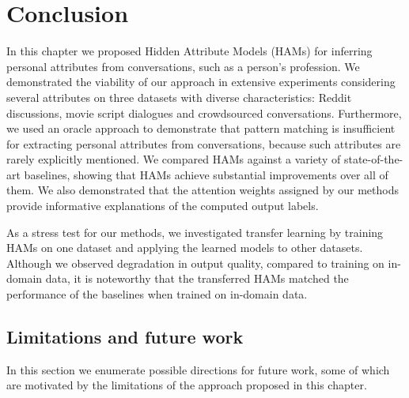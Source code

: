 \section{Conclusion}
In this chapter we proposed Hidden Attribute Models (HAMs) for inferring personal attributes from conversations, such as a person's profession. 
We demonstrated the viability of our approach in extensive experiments considering several attributes on three datasets with diverse characteristics: Reddit discussions, movie script dialogues and crowdsourced conversations. 
Furthermore, we used an oracle approach to demonstrate that pattern matching is insufficient for extracting personal attributes from conversations, because such attributes are rarely explicitly mentioned.
We compared HAMs against a variety of state-of-the-art baselines, showing that HAMs achieve
substantial improvements over all of them.%
We also demonstrated that the attention weights assigned by our methods provide
informative explanations of the computed output labels.

As a stress test for our methods, we investigated transfer learning by
training HAMs on one dataset and applying the learned models to other datasets.
Although we observed degradation in output quality, compared to
training on in-domain data, it is noteworthy that the transferred HAMs
matched the performance of the baselines when trained on in-domain data.

\subsection{Limitations and future work}

In this section we enumerate possible directions for future work, some of which are motivated by the limitations of the approach proposed in this chapter.

